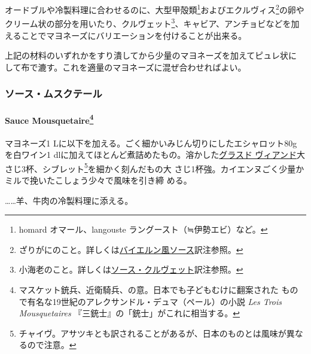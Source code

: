 \begin{recette}
オードブルや冷製料理に合わせるのに、大型甲殻類\footnote{homard
  オマール、langouste ラングースト（≒伊勢エビ）など。}およびエクルヴィス\footnote{ざりがにのこと。詳しくは\protect\hyperlink{sauce-bavaroise}{バイエルン風ソース}訳注参照。}の卵や
クリーム状の部分を用いたり、クルヴェット\footnote{小海老のこと。詳しくは\protect\hyperlink{sauce-aux-crevettes}{ソース・クルヴェット}訳注参照。}、キャビア、アンチョビなどを加
えることでマヨネーズにバリエーションを付けることが出来る。

上記の材料のいずれかをすり潰してから少量のマヨネーズを加えてピュレ状に
して布で漉す。これを適量のマヨネーズに混ぜ合わせればよい。

\maeaki

\hypertarget{ux30bdux30fcux30b9ux30e0ux30b9ux30afux30c6ux30fcux30eb}{%
\subsubsection{ソース・ムスクテール}\label{ux30bdux30fcux30b9ux30e0ux30b9ux30afux30c6ux30fcux30eb}}

\hypertarget{sauce-mousquetaire}{%
\paragraph[Sauce Mousquetaire]{\texorpdfstring{Sauce
Mousquetaire\footnote{マスケット銃兵、近衛騎兵、の意。日本でも子どもむけに翻案された
  もので有名な19世紀のアレクサンドル・デュマ（ペール）の小説 \emph{Les
  Trois Mousquetaires} 『三銃士』の「銃士」がこれに相当する。}}{Sauce Mousquetaire}}\label{sauce-mousquetaire}}


マヨネーズ1 Lに以下を加える。ごく細かいみじん切りにしたエシャロット80g
を白ワイン1\undemi{}
dlに加えてほとんど煮詰めたもの。溶かした\protect\hyperlink{glace-de-viande}{グラスド
ヴィアンド}大さじ3杯、シブレット\footnote{チャイヴ。アサツキとも訳されることがあるが、日本のものとは風味が異なるので注意。}を細かく刻んだもの大
さじ1杯強。カイエンヌごく少量かミルで挽いたこしょう少々で風味を引き締
める。

\ldots{}\ldots{}羊、牛肉の冷製料理に添える。

\maeaki


\end{recette}

